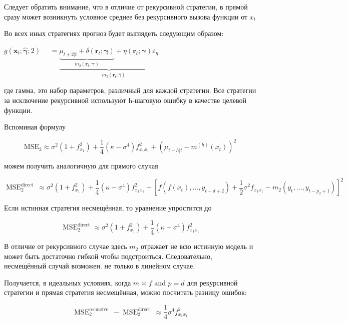 \documentclass[a4paper,12pt]{article}
\begin{document}
Следует обратить внимание, что в отличие от рекурсивной стратегии, в прямой сразу может возникнуть условное среднее без рекурсивного вызова функции от $ x_t $

Во всех иных стратегиях прогноз будет выглядеть следующим образом:

$g\left(\boldsymbol{x}_{t} ; \hat{\boldsymbol{\gamma}} ; 2\right)$
$\quad= \underbrace{\underbrace{\mu_{t+2 | t}+\delta\left(\boldsymbol{r}_{t} ; \boldsymbol{\gamma}\right)}_{m_{2}\left(\boldsymbol{r}_{t} ; \boldsymbol{\gamma}\right)}+\eta\left(\boldsymbol{r}_{t} ; \boldsymbol{\gamma}\right) \varepsilon_{\eta}}_{\quad \quad m_{2}\left(\boldsymbol{r}_{t} ; \hat{\gamma}\right)}$

где гамма, это набор параметров, различный для каждой стратегии. Все стратегии за исключение рекурсивной используют h-шаговую ошибку в качестве целевой функции.


Вспоминая формулу 

\[\mathrm{MSE}_{2} \approx \sigma^{2}\left(1+f_{x_{1}}^{2}\right)+\frac{1}{4}\left(\kappa-\sigma^{4}\right) f_{x_{1} x_{1}}^{2}+\left(\mu_{t+h | t}-m^{(h)}\left(x_{t}\right)\right)^{2}  \]

можем получить аналогичную для прямого случая

\[ \operatorname{MSE}_{2}^{\text {direct }} \approx \sigma^{2}\left(1+f_{x_{1}}^{2}\right)+\frac{1}{4}\left(\kappa-\sigma^{4}\right) f_{x_{1} x_{1}}^{2}+\left[f\left(f\left(x_{t}\right), \ldots, y_{t-d+2}\right)+\frac{1}{2} \sigma^{2} f_{x_{1} x_{1}}-m_{2}\left(y_{t}, \ldots, y_{t-p_{2}+1}\right)\right]^{2} \]

Если истинная стратегия несмещённая, то уравнение упростится до

\[  \operatorname{MSE}_{2}^{\operatorname{direct}} \approx \sigma^{2}\left(1+f_{x_{1}}^{2}\right)+\frac{1}{4}\left(\kappa-\sigma^{4}\right) f_{x_{1} x_{1}}^{2} \]

В отличие от рекурсивного случае здесь $ m_2 $ отражает не всю истинную модель и может быть достаточно гибкой чтобы подстроиться. Следовательно, несмещённый случай возможен. не только в линейном случае. 

Получается, в идеальных условиях, когда $ m \asymp f \text { and } p=d $ для рекурсивной стратегии и прямая стратегия несмещённая, можно посчитать разницу ошибок:

\[ \operatorname{MSE}_{2}^{\text {recursive }}-\operatorname{MSE}_{2}^{\text {direct }} \approx \frac{1}{4} \sigma^{4} f_{x_{1} x_{1}}^{2} \]
\end{document}

